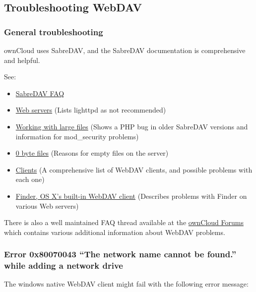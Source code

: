 \documentclass[letterpaper,10pt,english]{sphinxmanual}
\begin{document}
\subsection{Troubleshooting WebDAV}
\label{issues/general_troubleshooting:trouble-webdav-label}\label{issues/general_troubleshooting:troubleshooting-webdav}

\subsubsection{General troubleshooting}
\label{issues/general_troubleshooting:id2}
ownCloud uses SabreDAV, and the SabreDAV documentation is comprehensive and
helpful.

See:
\begin{itemize}
\item {} 
\href{http://sabre.io/dav/faq/}{SabreDAV FAQ}

\item {} 
\href{http://sabre.io/dav/webservers}{Web servers} (Lists lighttpd as not
recommended)

\item {} 
\href{http://sabre.io/dav/large-files/}{Working with large files} (Shows a PHP
bug in older SabreDAV versions and information for mod\_security problems)

\item {} 
\href{http://sabre.io/dav/0bytes}{0 byte files} (Reasons for empty files on the
server)

\item {} 
\href{http://sabre.io/dav/clients/}{Clients} (A comprehensive list of WebDAV
clients, and possible problems with each one)

\item {} 
\href{http://sabre.io/dav/clients/finder/}{Finder, OS X's built-in WebDAV client}
(Describes problems with Finder on various Web servers)

\end{itemize}

There is also a well maintained FAQ thread available at the \href{https://central.owncloud.org/t/how-to-fix-caldav-carddav-webdav-problems/852}{ownCloud Forums}
which contains various additional information about WebDAV problems.


\subsubsection{Error 0x80070043 ``The network name cannot be found.'' while adding a network drive}
\label{issues/general_troubleshooting:error-0x80070043-the-network-name-cannot-be-found-while-adding-a-network-drive}
The windows native WebDAV client might fail with the following error message:
\end{document}
